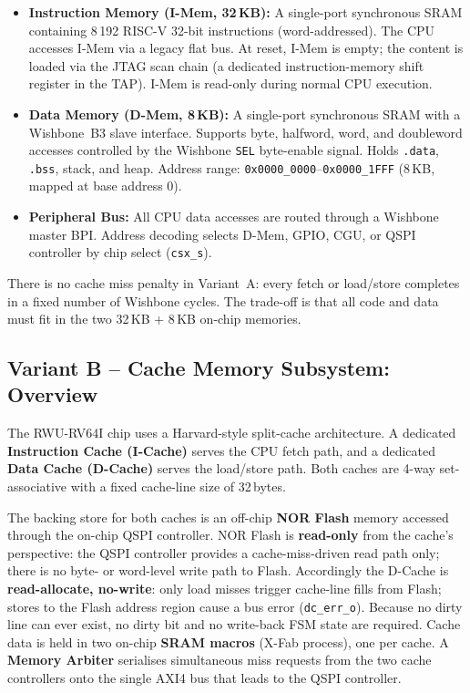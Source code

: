 \begin{itemize}
  \item \textbf{Instruction Memory (I-Mem, 32\,KB):}
    A single-port synchronous SRAM containing 8\,192 RISC-V 32-bit
    instructions (word-addressed).
    The CPU accesses I-Mem via a legacy flat bus.
    At reset, I-Mem is empty; the content is loaded via the JTAG scan chain
    (a dedicated instruction-memory shift register in the TAP).
    I-Mem is read-only during normal CPU execution.

  \item \textbf{Data Memory (D-Mem, 8\,KB):}
    A single-port synchronous SRAM with a Wishbone~B3 slave interface.
    Supports byte, halfword, word, and doubleword accesses controlled by the
    Wishbone \texttt{SEL} byte-enable signal.
    Holds \texttt{.data}, \texttt{.bss}, stack, and heap.
    Address range: \texttt{0x0000\_0000}--\texttt{0x0000\_1FFF}
    (8\,KB, mapped at base address 0).

  \item \textbf{Peripheral Bus:}
    All CPU data accesses are routed through a Wishbone master BPI.
    Address decoding selects D-Mem, GPIO, CGU, or QSPI controller by chip
    select (\texttt{csx\_s}).
\end{itemize}

There is no cache miss penalty in Variant~A: every fetch or load/store
completes in a fixed number of Wishbone cycles.
The trade-off is that all code and data must fit in the two 32\,KB + 8\,KB
on-chip memories.

\subsection{Variant B -- Cache Memory Subsystem: Overview}
\label{subsec:memCacheOverview}

The RWU-RV64I chip uses a Harvard-style split-cache architecture.
A dedicated \textbf{Instruction Cache (I-Cache)} serves the CPU fetch path,
and a dedicated \textbf{Data Cache (D-Cache)} serves the load/store path.
Both caches are 4-way set-associative with a fixed cache-line size of
32\,bytes.

The backing store for both caches is an off-chip \textbf{NOR Flash} memory
accessed through the on-chip QSPI controller.
NOR Flash is \textbf{read-only} from the cache's perspective: the QSPI
controller provides a cache-miss-driven read path only; there is no
byte- or word-level write path to Flash.
Accordingly the D-Cache is \textbf{read-allocate, no-write}: only load misses
trigger cache-line fills from Flash; stores to the Flash address region cause a
bus error (\texttt{dc\_err\_o}).
Because no dirty line can ever exist, no dirty bit and no write-back FSM state
are required.
Cache data is held in two on-chip \textbf{SRAM macros} (X-Fab process),
one per cache.
A \textbf{Memory Arbiter} serialises simultaneous miss requests from the two
cache controllers onto the single AXI4 bus that leads to the QSPI controller.

